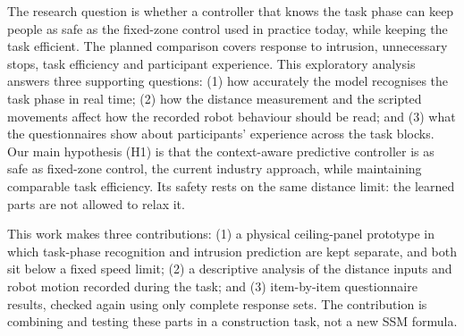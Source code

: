 \documentclass{IEEEtran}
\begin{document}
The research question is whether a controller that knows the task phase can
keep people as safe as the fixed-zone control used in practice today, while
keeping the task efficient. The planned comparison covers response
to intrusion, unnecessary stops, task efficiency and participant experience.
This exploratory analysis answers three supporting questions: (1) how
accurately the model recognises the task phase in real time; (2) how the
distance measurement and the scripted movements affect how the recorded robot
behaviour should be read; and (3) what the questionnaires show about
participants' experience across the task blocks. Our main hypothesis (H1) is
that the context-aware predictive controller is as safe as fixed-zone control,
the current industry approach, while maintaining comparable task efficiency.
Its safety rests on the same distance limit: the learned parts are not allowed
to relax it.

This work makes three contributions: (1) a physical ceiling-panel prototype in
which task-phase recognition and intrusion prediction are kept separate, and
both sit below a fixed speed limit; (2) a descriptive analysis of the distance
inputs and robot motion recorded during the task; and (3) item-by-item
questionnaire results, checked again using only complete response sets. The
contribution is combining and testing these parts in a construction task, not
a new SSM formula.
\end{document}
